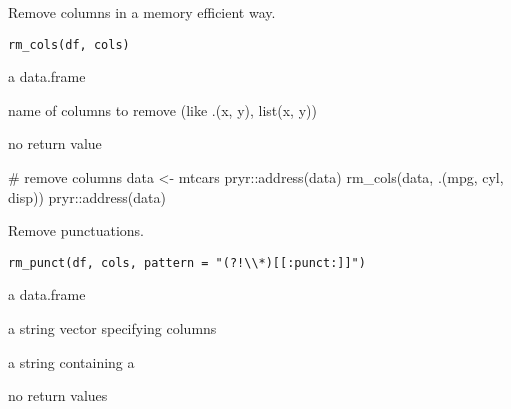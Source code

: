 \documentclass[letterpaper]{book}
\begin{document}
%
\begin{Description}
Remove columns in a memory efficient way.
\end{Description}
%
\begin{Usage}
\begin{verbatim}
rm_cols(df, cols)
\end{verbatim}
\end{Usage}
%
\begin{Arguments}
\begin{ldescription}
\item[\code{df}] a data.frame

\item[\code{cols}] name of columns to remove (like .(x, y), list(x, y))
\end{ldescription}
\end{Arguments}
%
\begin{Value}
no return value
\end{Value}
%
\begin{Examples}
\begin{ExampleCode}
# remove columns
data <- mtcars
pryr::address(data)
rm_cols(data, .(mpg, cyl, disp))
pryr::address(data)

\end{ExampleCode}
\end{Examples}
%
\begin{Description}
Remove punctuations.
\end{Description}
%
\begin{Usage}
\begin{verbatim}
rm_punct(df, cols, pattern = "(?!\\*)[[:punct:]]")
\end{verbatim}
\end{Usage}
%
\begin{Arguments}
\begin{ldescription}
\item[\code{df}] a data.frame

\item[\code{cols}] a string vector specifying columns

\item[\code{pattern}] a string containing a 
\end{ldescription}
\end{Arguments}
%
\begin{Value}
no return values
\end{Value}
\end{document}
